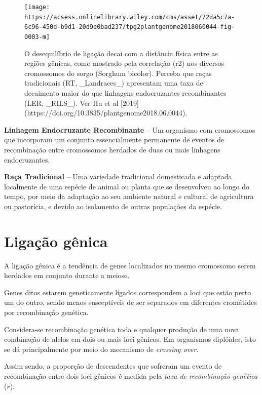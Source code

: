 \documentclass[
]{book}
\begin{document}
\begin{figure}

{\centering \texttt{[image: https://acsess.onlinelibrary.wiley.com/cms/asset/72da5c7a-6c96-450d-b9d1-20d9e0bad237/tpg2plantgenome2018060044-fig-0003-m]} 

}

\caption{O desequilíbrio de ligação decai com a distância física entre as regiões gênicas, como mostrado pela correlação (r2) nos diversos cromossomos do sorgo (Sorghum bicolor). Perceba que raças tradicionais (RT, _Landraces_) apresentam uma taxa de decaimento maior do que linhagens endocruzantes recombinantes (LER, _RILS_). Ver Hu et al [2019](https://doi.org/10.3835/plantgenome2018.06.0044).}\label{fig:LDsorghum}
\end{figure}

\textbf{Linhagem Endocruzante Recombinante} -- Um organismo com cromossomos que incorporam um conjunto essencialmente permanente de eventos de recombinação entre cromossomos herdados de duas ou mais linhagens endocruzantes.

\textbf{Raça Tradicional} -- Uma variedade tradicional domesticada e adaptada localmente de uma espécie de animal ou planta que se desenvolveu ao longo do tempo, por meio da adaptação ao seu ambiente natural e cultural de agricultura ou pastorícia, e devido ao isolamento de outras populações da espécie.

\hypertarget{ligauxe7uxe3o-guxeanica-1}{%
\section{Ligação gênica}\label{ligauxe7uxe3o-guxeanica-1}}

A ligação gênica é a tendência de genes localizados no mesmo cromossomo serem herdados em conjunto durante a meiose.

Genes ditos estarem geneticamente ligados correspondem a loci que estão perto um do outro, sendo menos susceptíveis de ser separados em diferentes cromátides por recombinação genética.

Considera-se recombinação genética toda e qualquer produção de uma nova combinação de alelos em dois ou mais loci gênicos. Em organismos diplóides, isto se dá principalmente por meio do mecanismo de \emph{crossing over}.

Assim sendo, a proporção de descendentes que sofreram um evento de recombinação entre dois loci gênicos é medida pela \emph{taxa de recombinação genética} (\(r\)).
\end{document}
